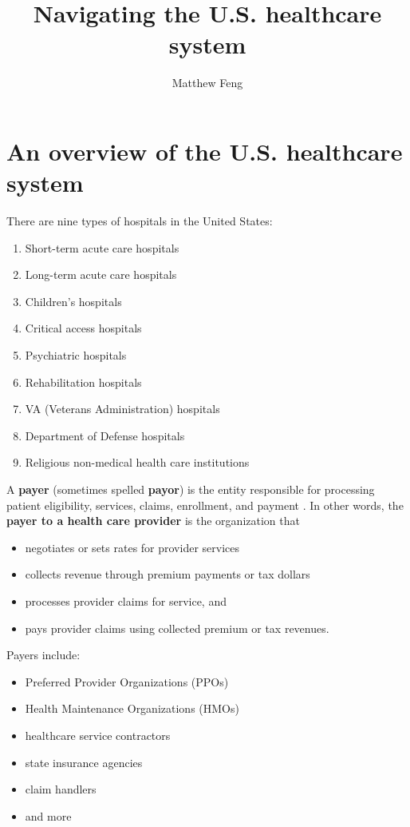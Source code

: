 \documentclass{article}
\title{Navigating the U.S. healthcare system}
\author{Matthew Feng}
\begin{document}
\maketitle

\section{An overview of the U.S. healthcare system}

There are nine types of hospitals in the United States:

\begin{enumerate}

\item Short-term acute care hospitals
\item Long-term acute care hospitals
\item Children’s hospitals
\item Critical access hospitals
\item Psychiatric hospitals
\item Rehabilitation hospitals
\item VA (Veterans Administration) hospitals
\item Department of Defense hospitals
\item Religious non-medical health care institutions

\end{enumerate}


A {\bf payer} (sometimes spelled {\bf payor}) is the entity responsible for processing patient eligibility, services, claims, enrollment, and payment \cite{defhealth-payers}. In other words, the {\bf payer to a health care provider} is the organization that

\begin{itemize}
\item negotiates or sets rates for provider services
\item collects revenue through premium payments or tax dollars
\item processes provider claims for service, and
\item pays provider claims using collected premium or tax revenues.
\end{itemize}

Payers include:

\begin{itemize}
\item Preferred Provider Organizations (PPOs)
\item Health Maintenance Organizations (HMOs)
\item healthcare service contractors
\item state insurance agencies
\item claim handlers
\item and more
\end{itemize}
\end{document}
